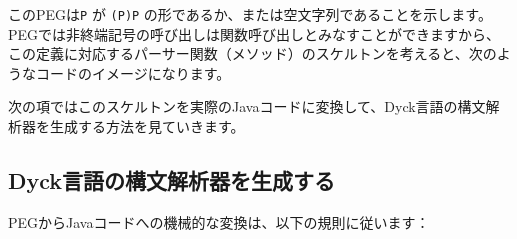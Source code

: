 このPEGは\texttt{P} が \texttt{(P)P}
の形であるか、または空文字列であることを示します。PEGでは非終端記号の呼び出しは関数呼び出しとみなすことができますから、この定義に対応するパーサー関数（メソッド）のスケルトンを考えると、次のようなコードのイメージになります。

\begin{Shaded}
\begin{Highlighting}[]
  \NormalTok{() \{}
     \NormalTok{(); }
\NormalTok{\}}

  \NormalTok{() \{}
\NormalTok{\}}
\end{Highlighting}
\end{Shaded}

次の項ではこのスケルトンを実際のJavaコードに変換して、Dyck言語の構文解析器を生成する方法を見ていきます。

\hypertarget{chapter6-dyckux8a00ux8a9eux306eux69cbux6587ux89e3ux6790ux5668ux3092ux751fux6210ux3059ux308b}{%
\subsection{Dyck言語の構文解析器を生成する}\label{chapter6-dyckux8a00ux8a9eux306eux69cbux6587ux89e3ux6790ux5668ux3092ux751fux6210ux3059ux308b}}

PEGからJavaコードへの機械的な変換は、以下の規則に従います：

